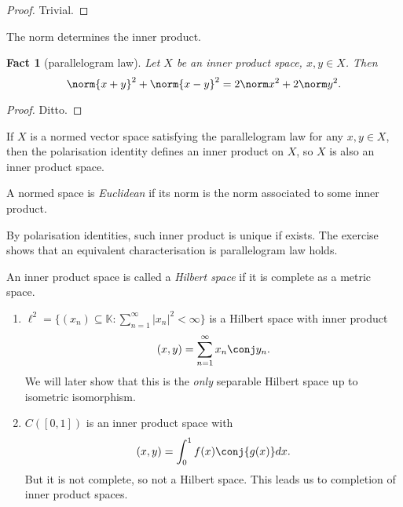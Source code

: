 \documentclass[a4paper]{article}
\newtheorem*{fact}{Fact}
\newcommand{\K}{{\mathbb{K}}} %
\begin{document}
\begin{proof}
  Trivial.
\end{proof}

\begin{corollary}
  The norm determines the inner product.
\end{corollary}

\begin{fact}[parallelogram law]
  Let \(X\) be an inner product space, \(x, y \in X\). Then
  \[
    \norm{x + y}^2 + \norm{x - y}^2 = 2 \norm x^2 + 2 \norm y^2.
  \]
\end{fact}

\begin{proof}
  Ditto.
\end{proof}

\begin{ex}
  If \(X\) is a normed vector space satisfying the parallelogram law for any \(x, y \in X\), then the polarisation identity defines an inner product on \(X\), so \(X\) is also an inner product space.
\end{ex}

\begin{definition}[Euclidean]
  A normed space is \emph{Euclidean} if its norm is the norm associated to some inner product.
\end{definition}

By polarisation identities, such inner product is unique if exists. The exercise shows that an equivalent characterisation is parallelogram law holds.

\begin{definition}
  An inner product space is called a \emph{Hilbert space} if it is complete as a metric space.
\end{definition}

\begin{eg}\leavevmode
  \begin{enumerate}
  \item \(\ell^2 = \{(x_n) \subseteq \K: \sum_{n = 1}^\infty |x_n|^2 < \infty\}\) is a Hilbert space with inner product
    \[
      (x, y) = \sum_{n = 1}^\infty x_n \conj y_n.
    \]
    We will later show that this is the \emph{only} separable Hilbert space up to isometric isomorphism.
  \item \(C([0, 1])\) is an inner product space with
    \[
      (x, y) = \int_0^1 f(x) \conj{g(x)} dx.
    \]
    But it is not complete, so not a Hilbert space. This leads us to completion of inner product spaces.
  \end{enumerate}
\end{eg}
\end{document}
